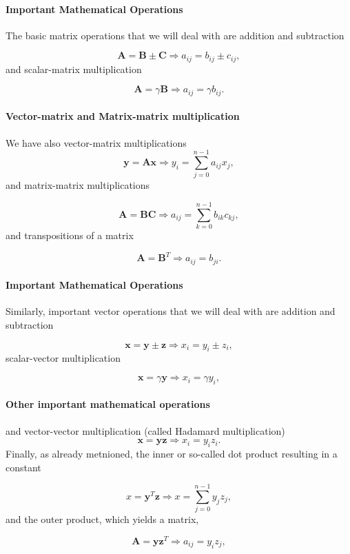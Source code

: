\paragraph{Important Mathematical Operations}

The basic matrix operations that we will deal with are addition and subtraction

\[
\bm{A}= \bm{B}\pm\bm{C}  \Longrightarrow a_{ij} = b_{ij}\pm c_{ij},
\]
and scalar-matrix multiplication

\[
\bm{A}= \gamma\bm{B}  \Longrightarrow a_{ij} = \gamma b_{ij}.
\]


\paragraph{Vector-matrix and Matrix-matrix multiplication}

We have also vector-matrix multiplications 
\[
\bm{y}=\bm{Ax}   \Longrightarrow y_{i} = \sum_{j=0}^{n-1} a_{ij}x_j,
\]
and matrix-matrix multiplications

\[
\bm{A}=\bm{BC}   \Longrightarrow a_{ij} = \sum_{k=0}^{n-1} b_{ik}c_{kj},
\]
and transpositions of a matrix

\[
\bm{A}=\bm{B}^T   \Longrightarrow a_{ij} = b_{ji}.
\]


\paragraph{Important Mathematical Operations}

Similarly, important vector operations that we will deal with are addition and subtraction

\[
\bm{x}= \bm{y}\pm\bm{z}  \Longrightarrow x_{i} = y_{i}\pm z_{i},
\]
scalar-vector multiplication

\[
\bm{x}= \gamma\bm{y}  \Longrightarrow x_{i} = \gamma y_{i},
\]


\paragraph{Other important mathematical operations}
and vector-vector multiplication (called Hadamard multiplication)
\[
\bm{x}=\bm{yz}   \Longrightarrow x_{i} = y_{i}z_i.
\]
Finally, as already metnioned, the inner or so-called dot product  resulting in a constant

\[
x=\bm{y}^T\bm{z}   \Longrightarrow x = \sum_{j=0}^{n-1} y_{j}z_{j},
\]
and the outer product, which yields a matrix,

\[
\bm{A}=  \bm{y}\bm{z}^T \Longrightarrow  a_{ij} = y_{i}z_{j},
\]


